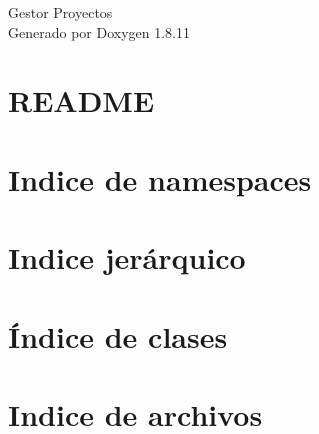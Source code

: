 \documentclass[twoside]{book}
\newcommand{\+}{\discretionary{\mbox{\scriptsize$\hookleftarrow$}}{}{}}
\newcommand{\clearemptydoublepage}{%
  \newpage{\pagestyle{empty}\cleardoublepage}%
}
\begin{document}
\hypersetup{pageanchor=false,
             bookmarksnumbered=true,
             pdfencoding=unicode
            }
\begin{titlepage}
\vspace*{7cm}
\begin{center}%
{\Large Gestor Proyectos }\\
\vspace*{1cm}
{\large Generado por Doxygen 1.8.11}\\
\end{center}
\end{titlepage}
\clearemptydoublepage
\tableofcontents
\clearemptydoublepage
{}
\hypersetup{pageanchor=true}

\chapter{R\+E\+A\+D\+ME}
\label{md_C:_GestorProyectos_README}
\hypertarget{md_C:_GestorProyectos_README}{}

\chapter{Indice de namespaces}

\chapter{Indice jerárquico}

\chapter{Índice de clases}

\chapter{Indice de archivos}

\end{document}

